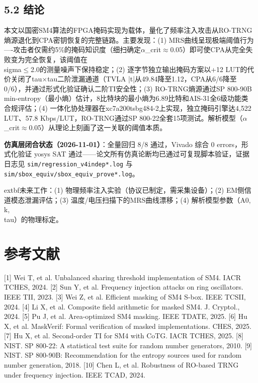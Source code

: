 \documentclass[journal]{IEEEtran}
\begin{document}
%


\subsection{5.2 结论}

本文以国密SM4算法的FPGA掩码实现为载体，量化了频率注入攻击从RO-TRNG熵源退化到CPA密钥恢复的完整链路。主要发现：(1) MRS曲线呈现极端阈值行为----攻击者仅需约5\%的掩码知识度（细扫确定$\alpha$\_crit$\approx$0.05）即可使CPA从完全失败变为完全恢复，该阈值在\\sigma$\leq$2.0的测量噪声下保持稳定；(2) 逐字节独立输出掩码方案以+12 LUT的代价关闭了tau$\times$tau二阶泄漏通道（TVLA |t|从49.84降至1.12，CPA从6/6降至0/6），并通过形式化验证确认二阶TI安全性；(3) RO-TRNG熵源通过SP 800-90B min-entropy（最小熵）估计，8比特块的最小熵为6.89比特和AIS-31全6级功能类合规评估；(4) 一体化协处理器在xc7a200tsbg484-2上实现，独立掩码引擎达4,522 LUT、57.8 Kbps/LUT，RO-TRNG通过SP 800-22全套15项测试。解析模型（$\alpha$\_crit$\approx$0.05）从理论上刻画了这一关联的阈值本质。

\textbf{仿真层闭合状态（2026-11-01）}：全量回归 8/8 通过，Vivado 综合 0 errors，形式化验证 yosys SAT 通过——论文所有仿真论断均已通过可复现脚本验证，证据日志见 \texttt{sim/regression\_v4indep*.log} 与 \texttt{sim/sbox\_equiv/sbox\_equiv\_prove*.log}。

	extbf{未来工作}：(1) 物理频率注入实验（协议已制定，需采集设备）；(2) EM侧信道模态泄漏评估；(3) 温度/电压扫描下的MRS曲线漂移；(4) 解析模型参数（A0, k, \\tau）的物理标定。

%


\section{参考文献}

[1] Wei T, et al. Unbalanced sharing threshold implementation of SM4. IACR TCHES, 2024.
[2] Sun Y, et al. Frequency injection attacks on ring oscillators. IEEE TII, 2023.
[3] Wei Z, et al. Efficient masking of SM4 S-box. IEEE TCSII, 2024.
[4] Li X, et al. Composite field arithmetic for masked SM4. J. Cryptol., 2024.
[5] Pu J, et al. Area-optimized SM4 masking. IEEE TDATE, 2025.
[6] Hu X, et al. MaskVerif: Formal verification of masked implementations. CHES, 2025.
[7] Hu X, et al. Second-order TI for SM4 with CoTG. IACR TCHES, 2025.
[8] NIST. SP 800-22: A statistical test suite for random number generators, 2010.
[9] NIST. SP 800-90B: Recommendation for the entropy sources used for random number generation, 2018.
[10] Chen L, et al. Robustness of RO-based TRNG under frequency injection. IEEE TCAD, 2024.
\end{document}
